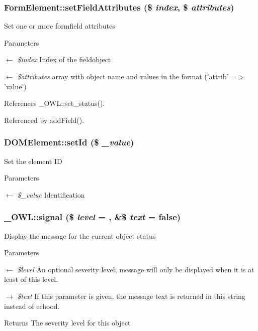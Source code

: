 \subsubsection[{setFieldAttributes}]{\setlength{\rightskip}{0pt plus 5cm}FormElement::setFieldAttributes (\$ {\em index}, \/  \$ {\em attributes})}\label{classFormElement_a50628436474976735e6452ef2439bc31}
Set one or more formfield attributes 
\begin{DoxyParams}{Parameters}
\item[\mbox{$\leftarrow$} {\em \$index}]Index of the fieldobject \item[\mbox{$\leftarrow$} {\em \$attributes}]array with object name and values in the format ('attrib' =$>$ 'value') \end{DoxyParams}


References \_\-OWL::set\_\-status().



Referenced by addField().

\subsubsection[{setId}]{\setlength{\rightskip}{0pt plus 5cm}DOMElement::setId (\$ {\em \_\-value})}\label{classDOMElement_afb849b6d94ad4911d255e7ede4ee0d83}
Set the element ID 
\begin{DoxyParams}{Parameters}
\item[\mbox{$\leftarrow$} {\em \$\_\-value}]Identification \end{DoxyParams}
\subsubsection[{signal}]{\setlength{\rightskip}{0pt plus 5cm}\_\-OWL::signal (\$ {\em level} = {}, \/  \&\$ {\em text} = {\ttfamily false})}\label{class__OWL_a51ba4a16409acf2a2f61f286939091a5}
Display the message for the current object status


\begin{DoxyParams}{Parameters}
\item[\mbox{$\leftarrow$} {\em \$level}]An optional severity level; message will only be displayed when it is at least of this level. \item[\mbox{$\rightarrow$} {\em \$text}]If this parameter is given, the message text is returned in this string instead of echood. \end{DoxyParams}
\begin{DoxyReturn}{Returns}
The severity level for this object 
\end{DoxyReturn}


